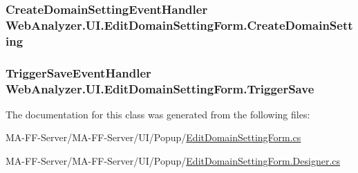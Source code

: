 \subsubsection[{Create\+Domain\+Setting}]{\setlength{\rightskip}{0pt plus 5cm}Create\+Domain\+Setting\+Event\+Handler Web\+Analyzer.\+U\+I.\+Edit\+Domain\+Setting\+Form.\+Create\+Domain\+Setting}\label{class_web_analyzer_1_1_u_i_1_1_edit_domain_setting_form_a15f150af99974a02e7df872db755b121}
\hypertarget{class_web_analyzer_1_1_u_i_1_1_edit_domain_setting_form_a1ddda08125c245cc97c50557b40f5fa2}{}
\subsubsection[{Trigger\+Save}]{\setlength{\rightskip}{0pt plus 5cm}Trigger\+Save\+Event\+Handler Web\+Analyzer.\+U\+I.\+Edit\+Domain\+Setting\+Form.\+Trigger\+Save}\label{class_web_analyzer_1_1_u_i_1_1_edit_domain_setting_form_a1ddda08125c245cc97c50557b40f5fa2}


The documentation for this class was generated from the following files\+:\begin{DoxyCompactItemize}
\item 
M\+A-\/\+F\+F-\/\+Server/\+M\+A-\/\+F\+F-\/\+Server/\+U\+I/\+Popup/\hyperlink{_edit_domain_setting_form_8cs}{Edit\+Domain\+Setting\+Form.\+cs}\item 
M\+A-\/\+F\+F-\/\+Server/\+M\+A-\/\+F\+F-\/\+Server/\+U\+I/\+Popup/\hyperlink{_edit_domain_setting_form_8_designer_8cs}{Edit\+Domain\+Setting\+Form.\+Designer.\+cs}\end{DoxyCompactItemize}

